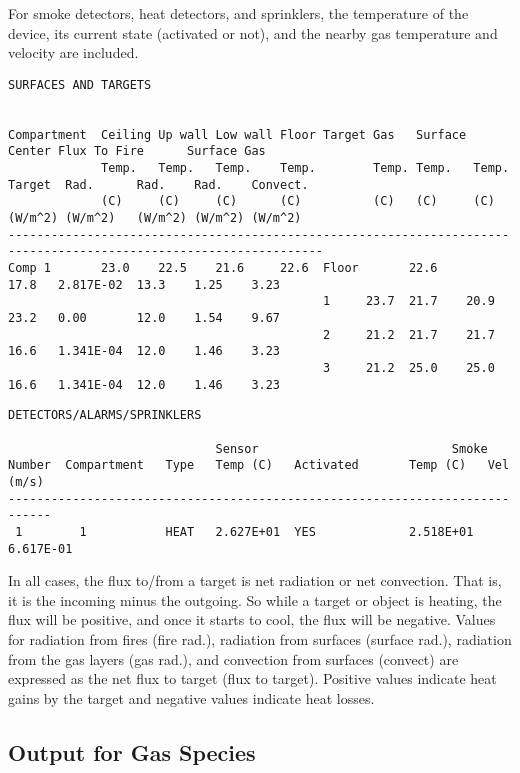 For smoke detectors, heat detectors, and sprinklers, the temperature of the device, its current state (activated or not), and the nearby gas temperature and velocity are included.

\begin{lstlisting}[basicstyle=\tiny]
SURFACES AND TARGETS


Compartment  Ceiling Up wall Low wall Floor Target Gas   Surface Center Flux To Fire      Surface Gas
             Temp.   Temp.   Temp.    Temp.        Temp. Temp.   Temp.  Target  Rad.      Rad.    Rad.    Convect.
             (C)     (C)     (C)      (C)          (C)   (C)     (C)    (W/m^2) (W/m^2)   (W/m^2) (W/m^2) (W/m^2)
------------------------------------------------------------------------------------------------------------------
Comp 1       23.0    22.5    21.6     22.6  Floor       22.6            17.8   2.817E-02  13.3    1.25    3.23
                                            1     23.7  21.7    20.9    23.2   0.00       12.0    1.54    9.67
                                            2     21.2  21.7    21.7    16.6   1.341E-04  12.0    1.46    3.23
                                            3     21.2  25.0    25.0    16.6   1.341E-04  12.0    1.46    3.23
\end{lstlisting}

\begin{lstlisting}[basicstyle=\scriptsize]
DETECTORS/ALARMS/SPRINKLERS

                             Sensor                           Smoke
Number  Compartment   Type   Temp (C)   Activated       Temp (C)   Vel (m/s)
----------------------------------------------------------------------------
 1        1           HEAT   2.627E+01  YES             2.518E+01  6.617E-01
\end{lstlisting}
In all cases, the flux to/from a target is net radiation or net convection. That is, it is the incoming minus the outgoing. So while a target or object is heating, the flux will be positive, and once it starts to cool, the flux will be negative. Values for radiation from fires (fire rad.), radiation from surfaces (surface rad.), radiation from the gas layers (gas rad.), and convection from surfaces (convect) are expressed as the net flux to target (flux to target). Positive values indicate heat gains by the target and negative values indicate heat losses.


\subsection{Output for Gas Species}

